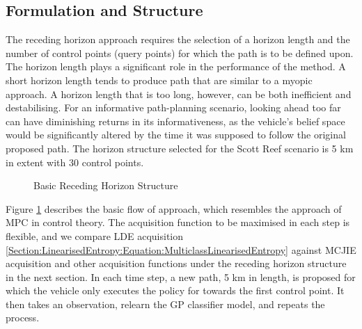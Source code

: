 \documentclass{article}
\begin{document}
	\subsection{Formulation and Structure}

		The receding horizon approach requires the selection of a horizon length and the number of control points (query points) for which the path is to be defined upon. The horizon length plays a significant role in the performance of the method. A short horizon length tends to produce path that are similar to a myopic approach. A horizon length that is too long, however, can be both inefficient and destabilising. For an informative path-planning scenario, looking ahead too far can have diminishing returns in its informativeness, as the vehicle's belief space would be significantly altered by the time it was supposed to follow the original proposed path. The horizon structure selected for the Scott Reef scenario is 5 km in extent with 30 control points.

	
		\begin{figure}[!htbp]
			\begin{center}
			\end{center}
		\caption{Basic Receding Horizon Structure}
		\label{Figure:Results:RecedingHorizonMethodOutline}
		\end{figure}
				
		Figure \ref{Figure:Results:RecedingHorizonMethodOutline} describes the basic flow of approach, which resembles the approach of MPC in control theory. The acquisition function to be maximised in each step is flexible, and we compare LDE acquisition \eqref{Section:LinearisedEntropy:Equation:MulticlassLinearisedEntropy} against MCJIE acquisition and other acquisition functions under the receding horizon structure in the next section. In each time step, a new path, 5 km in length, is proposed for which the vehicle only executes the policy for towards the first control point. It then takes an observation, relearn the GP classifier model, and repeats the process. 
		
\end{document}
